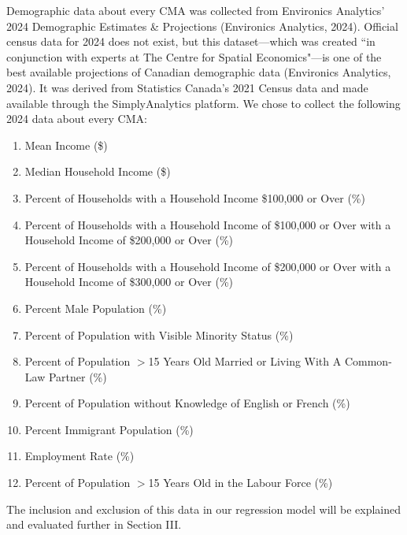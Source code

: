 \documentclass[AEJ]{AEA}
\begin{document}
Demographic data about every CMA was collected from Environics Analytics’ 2024 
Demographic Estimates \& Projections (Environics Analytics, 2024). Official census 
data for 2024 does
not exist, but this dataset—which was created ``in conjunction with experts at 
The Centre for Spatial Economics"—is one of the best available projections of
Canadian demographic data (Environics Analytics, 2024). It was derived from 
Statistics Canada’s 2021
Census data and made available through the SimplyAnalytics platform. We chose to
collect the following 2024 data about every CMA:
\begin{enumerate}
  \item Mean Income (\$)
  \item Median Household Income (\$)
  \item Percent of Households with a Household Income \$100,000 or Over (\%)
  \item Percent of Households with a Household Income of \$100,000 or Over with a
  Household Income of \$200,000 or Over (\%)
  \item Percent of Households with a Household Income of \$200,000 or Over with a
  Household Income of \$300,000 or Over (\%)
  \item Percent Male Population (\%)
  \item Percent of Population with Visible Minority Status (\%)
  \item Percent of Population $>$15 Years Old Married or Living With A 
  Common-Law Partner (\%)
  \item Percent of Population without Knowledge of English or French (\%)
  \item Percent Immigrant Population (\%)
  \item Employment Rate (\%)
  \item Percent of Population $>$15 Years Old in the Labour Force (\%)
\end{enumerate}
The inclusion and exclusion of this data in our regression model will be explained and
evaluated further in Section III.
\end{document}
